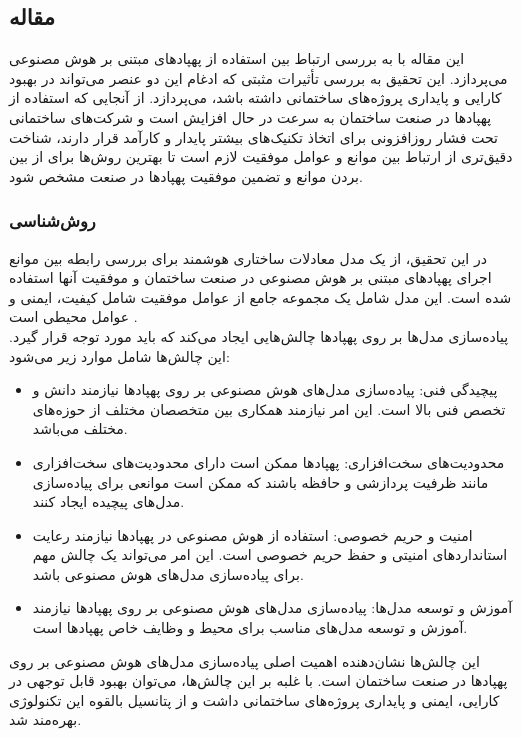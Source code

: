 \subsection{مقاله }
این مقاله با به بررسی ارتباط بین استفاده از پهپادهای مبتنی بر هوش مصنوعی می‌پردازد. این تحقیق به بررسی تأثیرات مثبتی که ادغام این دو عنصر می‌تواند در بهبود کارایی و پایداری پروژه‌های
ساختمانی داشته باشد، می‌پردازد. از آنجایی که استفاده از پهپادها در صنعت ساختمان به سرعت در حال افزایش است و شرکت‌های ساختمانی تحت فشار روزافزونی برای اتخاذ 
تکنیک‌های بیشتر پایدار و کارآمد قرار دارند، شناخت دقیق‌تری از ارتباط بین موانع و عوامل موفقیت لازم است تا بهترین روش‌ها برای از بین بردن موانع و تضمین موفقیت پهپادها در صنعت مشخص شود.

\subsubsection{روش‌شناسی}
در این تحقیق، از یک مدل معادلات ساختاری هوشمند برای بررسی رابطه بین موانع اجرای پهپادهای مبتنی بر هوش مصنوعی در صنعت ساختمان و موفقیت آنها استفاده شده است.
این مدل شامل یک مجموعه جامع از عوامل موفقیت شامل کیفیت، ایمنی و عوامل محیطی است .
\\
پیاده‌سازی مدل‌ها بر روی پهپادها چالش‌هایی ایجاد می‌کند که باید مورد توجه قرار گیرد. این چالش‌ها شامل موارد زیر می‌شود:
\begin{itemize}
    \item پیچیدگی فنی: پیاده‌سازی مدل‌های هوش مصنوعی بر روی پهپادها نیازمند دانش و تخصص فنی بالا است. این امر نیازمند همکاری بین متخصصان مختلف از حوزه‌های مختلف می‌باشد.
    \item محدودیت‌های سخت‌افزاری: پهپادها ممکن است دارای محدودیت‌های سخت‌افزاری مانند ظرفیت پردازشی و حافظه باشند که ممکن است موانعی برای پیاده‌سازی مدل‌های پیچیده ایجاد کنند.
    \item امنیت و حریم خصوصی: استفاده از هوش مصنوعی در پهپادها نیازمند رعایت استانداردهای امنیتی و حفظ حریم خصوصی است. این امر می‌تواند یک چالش مهم برای پیاده‌سازی مدل‌های هوش مصنوعی باشد.
    \item آموزش و توسعه مدل‌ها: پیاده‌سازی مدل‌های هوش مصنوعی بر روی پهپادها نیازمند آموزش و توسعه مدل‌های مناسب برای محیط و وظایف خاص پهپادها است.
\end{itemize}
این چالش‌ها نشان‌دهنده اهمیت اصلی پیاده‌سازی مدل‌های هوش مصنوعی بر روی پهپادها در صنعت ساختمان است. با غلبه بر این چالش‌ها، می‌توان بهبود 
قابل توجهی در کارایی، ایمنی و پایداری پروژه‌های ساختمانی داشت و از پتانسیل بالقوه این تکنولوژی بهره‌مند شد.
